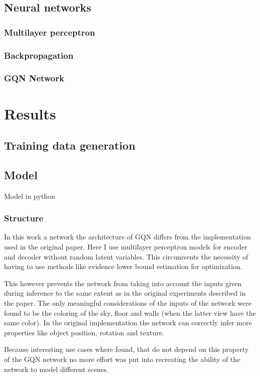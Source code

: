 \documentclass[a4paper, twoside, 10pt]{report}
\begin{document}
\section{Neural networks}
\subsection{Multilayer perceptron}
\subsection{Backpropagation}
\subsection{GQN Network}
\cite{gqn}

\chapter{Results}
\section{Training data generation}
\section{Model}
Model in python

\subsection{Structure}
In this work a network the architecture of GQN differs from the implementation used in the original paper. Here I use multilayer perceptron models for encoder and decoder without random latent variables. This circumvents the necessity of having to use methods like evidence lower bound estimation for optimization.

This however prevents the network from taking into account the inputs given during inference to the same extent as in the original experiments described in the paper. The only meaningful considerations of the inputs of the network were found to be the coloring of the sky, floor and walls (when the latter view have the same color). In the original implementation the network can correctly infer more properties like object position, rotation and texture.

Because interesting use cases where found, that do not depend on this property of the GQN network no more effort was put into recreating the ability of the network to model different scenes.
\end{document}
